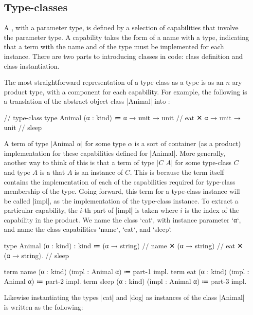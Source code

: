 \subsection{Type-classes}

A , with a parameter type, is defined by a selection of capabilities that involve the parameter type.
A capability takes the form of a name with a type, indicating that a term with the name and of the type must be implemented for each instance.
There are two parts to introducing classes in code: class definition and class instantiation.

The most straightforward representation of a type-class as a type is as an $n$-ary product type, with a component for each capability.
For example, the following is a translation of the abstract object-class \code|Animal| into \LangA:
\begin{snippet}
// type-class
type Animal (α : kind)
  ≔ α → unit → unit // eat
  ✕ α → unit → unit // sleep
\end{snippet}
A term of type \code|Animal $α$| for some type $α$ is a sort of container (as a product) implementation for these capabilities defined for \code|Animal|.
More generally, another way to think of this is that a term of type \code|$C$ $A$| for some type-class $C$ and type $A$ is a  that $A$ is an instance of $C$.
This is because the term itself contains the implementation of each of the capabilities required for type-class membership of the type.
Going forward, this term for a type-class instance will be called \code|impl|, as the implementation of the type-class instance.
To extract a particular capability, the $i$-th part of \code|impl| is taken where $i$ is the index of the capability in the product.
We name the class \code`cat`, with instance parameter \code`α`, and name the class capabilities \code`name`, \code`eat`, and \code`sleep`.
\begin{snippet}
type Animal (α : kind) : kind
  ≔ (α → string)  // name
  ✕ (α → string)  // eat
  ✕ (α → string). // sleep

term name  (α : kind) (impl : Animal α) ≔ part-1 impl.
term eat   (α : kind) (impl : Animal α) ≔ part-2 impl.
term sleep (α : kind) (impl : Animal α) ≔ part-3 impl.
\end{snippet}
Likewise instantiating the types \code|cat| and \code|dog| as instances of the class \code|Animal| is written as the following:

